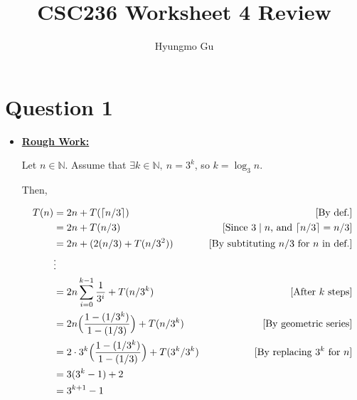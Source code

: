 \documentclass[12pt]{article}
\begin{document}
\title{CSC236 Worksheet 4 Review}
\author{Hyungmo Gu}
\maketitle

\section*{Question 1}
\begin{itemize}
    \item

    \bigskip

    \begin{mdframed}
    \underline{\textbf{Rough Work:}}

    \bigskip

    Let $n \in \mathbb{N}$. Assume that $\exists k \in \mathbb{N},\:n = 3^k$, so
    $k = \log_3 n$.

    \bigskip

    Then,

    \bigskip

    \begin{align}
        T(n) &= 2n + T(\lceil n/3 \rceil) & [\text{By def.}]\\
        &= 2n + T(n/3) & [\text{Since $3 \mid n$, and $\lceil n/3 \rceil = n/3$}]\\
        &= 2n + (2(n/3) + T(n/3^2)) & [\text{By subtituting $n/3$ for $n$ in def.}]\\
        &\vdots\\
        &=2n\sum\limits_{i=0}^{k-1} \frac{1}{3^i} + T(n/3^k) & [\text{After $k$ steps}]\\
        &=2n \Bigl( \frac{1 - (1/3^k)}{1 - (1/3)} \Bigr) + T(n/3^k) & [\text{By geometric series}]\\
        &=2 \cdot 3^k \Bigl( \frac{1 - (1/3^k)}{1 - (1/3)}  \Bigr) + T(3^k/3^k) & [\text{By replacing $3^k$ for $n$}]\\
        &=3(3^k - 1) + 2\\
        &=3^{k+1} - 1
    \end{align}

    \end{mdframed}
\end{itemize}
\end{document}

